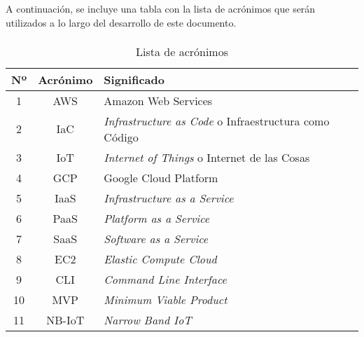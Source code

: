 \documentclass[../../memoria.tex]{subfiles}
\begin{document}
A continuación, se incluye una tabla con la lista de acrónimos que serán utilizados a lo largo del desarrollo de
este documento.

\paragraph{}

\begin{table}[h]
    \centering
    \begin{tabular}{ccl}
        \hline
        \multicolumn{1}{l}{\textbf{Nº}} & \multicolumn{1}{l}{\textbf{Acrónimo}} & \textbf{Significado}                                          \\ \hline
        1                               & AWS                                   & Amazon Web Services                                           \\
        2                               & IaC                                   & \textit{Infrastructure as Code} o Infraestructura como Código \\
        3                               & IoT                                   & \textit{Internet of Things} o Internet de las Cosas           \\
        4                               & GCP                                   & Google Cloud Platform                                         \\
        5                               & IaaS                                  & \textit{Infrastructure as a Service}                          \\
        6                               & PaaS                                  & \textit{Platform as a Service}                                \\
        7                               & SaaS                                  & \textit{Software as a Service}                                \\
        8                               & EC2                                   & \textit{Elastic Compute Cloud}                                \\
        9                               & CLI                                   & \textit{Command Line Interface}                               \\
        10                              & MVP                                   & \textit{Minimum Viable Product}                               \\
        11                              & NB-IoT                                & \textit{Narrow Band IoT}                                      \\
        \hline
    \end{tabular}
    \caption {Lista de acrónimos}
\end{table}
\end{document}
